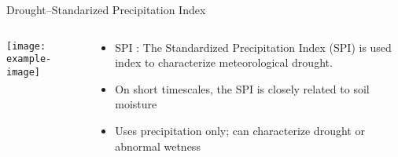 \documentclass{beamer}
\begin{document}
\begin{frame}{Drought--Standarized Precipitation Index}
    \begin{columns}[onlytextwidth,T]
        \begin{column}{.47\textwidth}
            \texttt{[image: example-image]}
        \end{column}
        \begin{column}{.47\textwidth}
          \begin{itemize}
              \item SPI :  The Standardized Precipitation Index (SPI) is used index to characterize meteorological drought.
              \item On short timescales, the SPI is closely related to soil moisture
              \item Uses precipitation only; can characterize drought or abnormal wetness
        \end{itemize}
        \end{column}
    \end{columns}
\end{frame}
\end{document}
